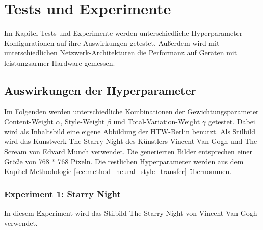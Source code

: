\chapter{Tests und Experimente}
\label{cha:tests}

Im Kapitel Tests und Experimente werden unterschiedliche Hyperparameter-Konfigurationen auf ihre Auswirkungen getestet. Außerdem wird mit unterschiedlichen
Netzwerk-Architekturen die Performanz auf Geräten mit leistungsarmer Hardware gemessen.

\section{Auswirkungen der Hyperparameter}

Im Folgenden werden unterschiedliche Kombinationen der Gewichtungsparameter Content-Weight $ \alpha $, Style-Weight $ \beta $ und Total-Variation-Weight $ \gamma $ getestet. Dabei wird als Inhaltsbild  eine eigene Abbildung der HTW-Berlin benutzt. Als Stilbild wird das Kunstwerk The Starry Night des Künstlers Vincent Van Gogh und The Scream von Edvard Munch verwendet. Die generierten Bilder entsprechen einer Größe von 768 * 768 Pixeln. Die restlichen Hyperparameter werden aus dem Kapitel Methodologie \ref{sec:method_neural_style_transfer} übernommen.

\pagebreak

\subsection{Experiment 1: Starry Night}

In diesem Experiment wird das Stilbild The Starry Night von Vincent Van Gogh verwendet.

